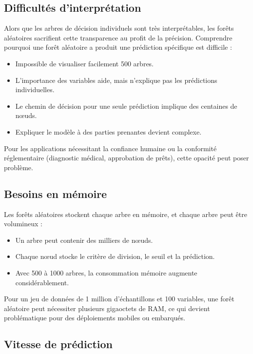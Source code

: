 \subsection{ Difficultés d’interprétation}

Alors que les arbres de décision individuels sont très interprétables, les forêts aléatoires sacrifient cette transparence au profit de la précision. Comprendre pourquoi une forêt aléatoire a produit une prédiction spécifique est difficile :

\begin{itemize}
    \item Impossible de visualiser facilement 500 arbres.
    \item L’importance des variables aide, mais n’explique pas les prédictions individuelles.
    \item Le chemin de décision pour une seule prédiction implique des centaines de nœuds.
    \item Expliquer le modèle à des parties prenantes devient complexe.
\end{itemize}

Pour les applications nécessitant la confiance humaine ou la conformité réglementaire (diagnostic médical, approbation de prêts), cette opacité peut poser problème.

\subsection{ Besoins en mémoire}

Les forêts aléatoires stockent chaque arbre en mémoire, et chaque arbre peut être volumineux :

\begin{itemize}
    \item Un arbre peut contenir des milliers de nœuds.
    \item Chaque nœud stocke le critère de division, le seuil et la prédiction.
    \item Avec 500 à 1000 arbres, la consommation mémoire augmente considérablement.
\end{itemize}

Pour un jeu de données de 1 million d’échantillons et 100 variables, une forêt aléatoire peut nécessiter plusieurs gigaoctets de RAM, ce qui devient problématique pour des déploiements mobiles ou embarqués.

\subsection{ Vitesse de prédiction}

